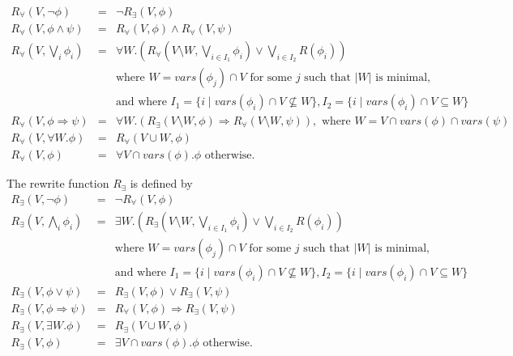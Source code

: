 \documentclass{article}
\newcommand{\vars}{\mathit{vars}}
\begin{document}
\begin{equation*}
\begin{array}{lll}
R_{\forall}(V,\neg \phi) &=& \neg R_{\exists}(V,\phi)\\

R_{\forall}(V,\phi\wedge \psi)&=&R_{\forall}(V,\phi)\wedge R_{\forall}(V,\psi)\\

R_{\forall}(V, \bigvee_i \phi_i)&=&
  \forall W.
    \left(
         R_\forall(V \setminus W, \bigvee_{i \in I_1}\phi_i) \lor \bigvee_{i \in I_2}R(\phi_i)
    \right) \\
  && \text{where } W = \vars(\phi_j) \cap V \text{ for some $j$ such that $|W|$ is minimal,} \\
  && \text{and where } I_1 = \{ i \mid \vars(\phi_i) \cap V \nsubseteq W \}, I_2 = \{ i \mid \vars(\phi_i) \cap V \subseteq W \} \\

R_{\forall}(V,\phi\Rightarrow\psi)&=&
\forall W.(R_{\exists}(V\setminus W,\phi)\Rightarrow{}
R_{\forall}(V \setminus W,\psi)), 
\text{ where } W = V \cap \vars(\phi) \cap \vars(\psi) \\

R_{\forall}(V,\forall W.\phi)&=&R_{\forall}(V \cup W,\phi) \\

R_{\forall}(V,\phi)&=&\forall V\cap \vars(\phi).\phi\textrm{ otherwise}.

\end{array}
\end{equation*}

The rewrite function $R_{\exists}$ is defined by
\begin{equation*}
\begin{array}{lll}
R_{\exists}(V,\neg \phi)&=&\neg R_{\forall}(V,\phi)\\

R_{\exists}(V, \bigwedge_i \phi_i)&=&
  \exists W.
    \left(
         R_\exists(V \setminus W, \bigvee_{i \in I_1}\phi_i) \lor \bigvee_{i \in I_2}R(\phi_i)
    \right) \\
  && \text{where } W = \vars(\phi_j) \cap V \text{ for some $j$ such that $|W|$ is minimal,} \\
  && \text{and where } I_1 = \{ i \mid \vars(\phi_i) \cap V \nsubseteq W \}, I_2 = \{ i \mid \vars(\phi_i) \cap V \subseteq W \} \\

R_{\exists}(V,\phi\vee \psi)&=&R_{\exists}(V,\phi)\vee R_{\exists}(V,\psi)\\

R_{\exists}(V,\phi\Rightarrow\psi)&=&
R_{\forall}(V,\phi)\Rightarrow R_{\exists}(V,\psi)\\

R_{\exists}(V,\exists W.\phi)&=&R_{\exists}(V \cup W,\phi)\\

R_{\exists}(V,\phi)&=&\exists V\cap\vars(\phi).\phi\textrm{ otherwise}.
\end{array}
\end{equation*}
\end{document}

